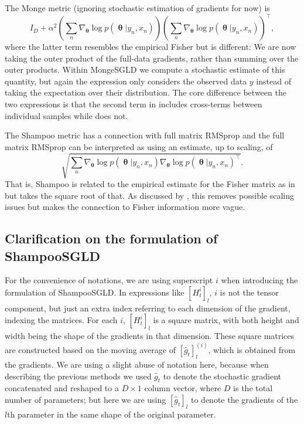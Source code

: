\documentclass[10pt]{article} %
\DeclareMathOperator{\btheta}{\boldsymbol{\theta}}
\theoremstyle{plain}
\theoremstyle{definition}
\theoremstyle{remark}
\begin{document}
The Monge metric (ignoring stochastic estimation of gradients for now) is
\begin{equation}
I_{D}+\alpha^{2}\left(\sum_{n}\nabla_{\btheta}\log p(\btheta|y_{n}, x_{n})\right)\left(\sum_{n}\nabla_{\btheta}\log p(\btheta | y_{n}, x_{n})\right)^{\top},
\label{eq:mongeAsEF}
\end{equation}
where the latter term resembles the empirical Fisher but is different: We are now taking the outer product of the full-data gradients, rather than summing over the outer products. Within MongeSGLD we compute a stochastic estimate of this quantity, but again the expression only considers the observed data $y$ instead of taking the expectation over their distribution. The core difference between the two expressions is that the second term in  includes cross-terms between individual samples while  does not. 

The Shampoo metric has a connection with full matrix RMSprop and the full matrix RMSprop can be interpreted as using an estimate, up to scaling, of
\begin{equation*}
\sqrt{\sum_{n}\nabla_{\btheta}\log p(\btheta|y_{n}, x_{n})\nabla_{\btheta}\log p(\btheta|y_{n}, x_{n})^{\top}}.
\end{equation*}
That is, Shampoo is related to the empirical estimate for the Fisher matrix as in  but takes the square root of that. As discussed by \citet{Kunstner2019}, this removes possible scaling issues but makes the connection to Fisher information more vague.

\subsection{Clarification on the formulation of ShampooSGLD}
\label{app:notation}

For the convenience of notations, we are using superscript $i$ when introducing the formulation of ShampooSGLD. In expressions like $[H_{t}^{i}]_{l}$, $i$ is not the tensor component, but just an extra index referring to each dimension of the gradient, indexing the matrices. For each $i$, $[H_{t}^{i}]_{l}$ is a square matrix, with both height and width being the shape of the gradients in that dimension. These square matrices are constructed based on the moving average of $[\hat{g}_{t}]_{l}^{(i)}$, which is obtained from the gradients. We are using a slight abuse of notation here, because when describing the previous methods we used $\hat{g}_{t}$ to denote the stochastic gradient concatenated and reshaped to a $D\times 1$ column vector, where $D$ is the total number of parameters; but here we are using $[\hat{g}_{t}]_{l}$ to denote the gradients of the $l$th parameter in the same shape of the original parameter.
\end{document}
